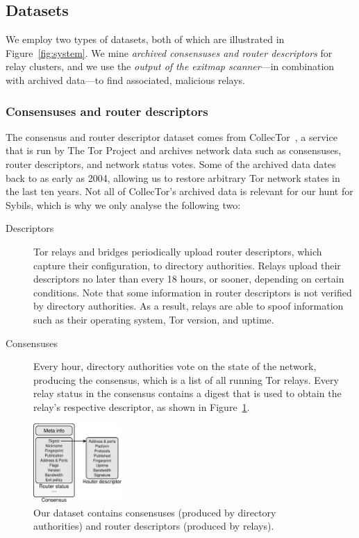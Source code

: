 \subsection{Datasets}
\label{sec:datasets}
We employ two types of datasets, both of which are illustrated in
Figure~\ref{fig:system}.  We mine \emph{archived consensuses and router
descriptors} for relay clusters, and we use the \emph{output of the exitmap
scanner}---in combination with archived data---to find associated, malicious
relays.

\subsubsection{Consensuses and router descriptors}
The consensus and router descriptor dataset comes from
CollecTor~\cite{collector}, a service that is run by The Tor Project and
archives network data such as consensuses, router descriptors, and network
status votes.  Some of the archived data dates back to as early as 2004,
allowing us to restore arbitrary Tor network states in the last ten years.  Not
all of CollecTor's archived data is relevant for our hunt for Sybils, which is
why we only analyse the following two:

\begin{description}
	\item[Descriptors] Tor relays and bridges periodically upload router
		descriptors, which capture their configuration, to directory
		authorities.  Relays upload their descriptors no later than every 18
		hours, or sooner, depending on certain conditions.  Note that some
		information in router descriptors is not verified by directory
		authorities.  As a result, relays are able to spoof information such as
		their operating system, Tor version, and uptime.

	\item[Consensuses] Every hour, directory authorities vote on the state of
		the network, producing the consensus, which is a list of all running Tor
		relays.  Every relay status in the consensus contains a digest that is
		used to obtain the relay's respective descriptor, as shown in
		Figure~\ref{fig:datasets}.
\end{description}

\begin{figure}[t]
	\centering
	\includegraphics[width=0.3\textwidth]{diagrams/data_sets.pdf}
	\caption{Our dataset contains consensuses (produced by directory
		authorities) and router descriptors (produced by relays).}
	\label{fig:datasets}
\end{figure}

